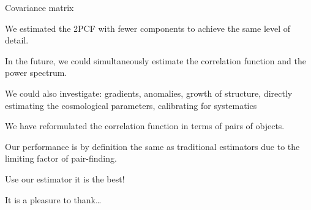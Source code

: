 \documentclass[modern]{aastex62}
\begin{document}
Covariance matrix

We estimated the 2PCF with fewer components to achieve the same level of detail.

In the future, we could simultaneously estimate the correlation function and the power spectrum.

We could also investigate: gradients, anomalies, growth of structure, directly estimating the cosmological parameters, calibrating for systematics

We have reformulated the correlation function in terms of pairs of objects.

Our performance is by definition the same as traditional estimators due to the limiting factor of pair-finding.

Use our estimator it is the best!

\acknowledgements
It is a pleasure to thank\ldots
\end{document}
